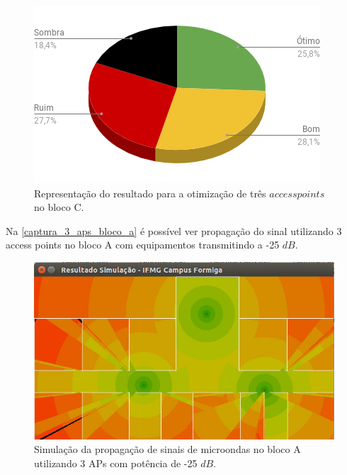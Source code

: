 \documentclass[
	12pt,				%
	twoside,			%
	a4paper,			%
	english,			%
	french,				%
	spanish,			%
	brazil				%
	]{abntex2}
\begin{document}
\begin{figure}[ht]
    \caption{\label{percent_bloco_c_3} Representação do resultado para a otimização de três $access points$ no bloco C.}
    \begin{center}
        \includegraphics[scale=0.7]{imagens/percent-bloco-c-3.png}
    \end{center}
\end{figure}

Na \autoref{captura_3_aps_bloco_a} é possível ver propagação do sinal
utilizando 3 access points no bloco A com equipamentos transmitindo a
-25 \(dB\).

\begin{figure}[ht]
    \caption{\label{captura_3_aps_bloco_a} Simulação da propagação de sinais de microondas no bloco A utilizando 3 APs com potência de -25 $dB$.}
    \begin{center}
        \includegraphics[scale=0.7]{imagens/captura-3-aps-bloco-a.jpg}
    \end{center}
\end{figure}
\end{document}
